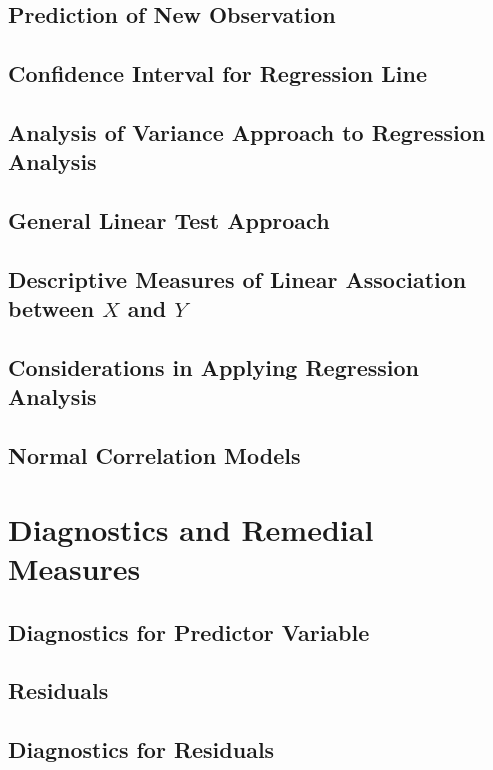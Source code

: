 \subsection{Prediction of New Observation}

\subsection{Confidence Interval for Regression Line}

\subsection{Analysis of Variance Approach to Regression Analysis}

\subsection{General Linear Test Approach}

\subsection{Descriptive Measures of Linear Association between $X$ and $Y$}

\subsection{Considerations in Applying Regression Analysis}

\subsection{Normal Correlation Models}


\section{Diagnostics and Remedial Measures}
\subsection{Diagnostics for Predictor Variable}

\subsection{Residuals}

\subsection{Diagnostics for Residuals}

